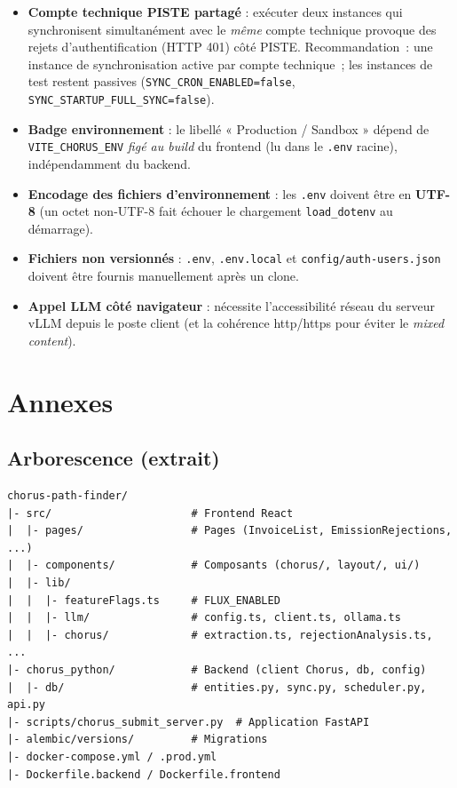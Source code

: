 \documentclass[11pt,a4paper]{article}
\newcommand{\code}[1]{\texttt{\small #1}}
\begin{document}
\begin{itemize}[nosep]
  \item \textbf{Compte technique PISTE partagé} : exécuter deux instances qui
        synchronisent simultanément avec le \emph{même} compte technique
        provoque des rejets d'authentification (HTTP 401) côté PISTE.
        Recommandation~: une instance de synchronisation active par compte
        technique~; les instances de test restent passives
        (\code{SYNC\_CRON\_ENABLED=false}, \code{SYNC\_STARTUP\_FULL\_SYNC=false}).
  \item \textbf{Badge environnement} : le libellé « Production / Sandbox » dépend
        de \code{VITE\_CHORUS\_ENV} \emph{figé au build} du frontend (lu dans le
        \code{.env} racine), indépendamment du backend.
  \item \textbf{Encodage des fichiers d'environnement} : les \code{.env} doivent
        être en \textbf{UTF-8} (un octet non-UTF-8 fait échouer le chargement
        \code{load\_dotenv} au démarrage).
  \item \textbf{Fichiers non versionnés} : \code{.env}, \code{.env.local} et
        \code{config/auth-users.json} doivent être fournis manuellement après un
        clone.
  \item \textbf{Appel LLM côté navigateur} : nécessite l'accessibilité réseau du
        serveur vLLM depuis le poste client (et la cohérence http/https pour
        éviter le \emph{mixed content}).
\end{itemize}

\section{Annexes}

\subsection{Arborescence (extrait)}
\begin{lstlisting}
chorus-path-finder/
|- src/                      # Frontend React
|  |- pages/                 # Pages (InvoiceList, EmissionRejections, ...)
|  |- components/            # Composants (chorus/, layout/, ui/)
|  |- lib/
|  |  |- featureFlags.ts     # FLUX_ENABLED
|  |  |- llm/                # config.ts, client.ts, ollama.ts
|  |  |- chorus/             # extraction.ts, rejectionAnalysis.ts, ...
|- chorus_python/            # Backend (client Chorus, db, config)
|  |- db/                    # entities.py, sync.py, scheduler.py, api.py
|- scripts/chorus_submit_server.py  # Application FastAPI
|- alembic/versions/         # Migrations
|- docker-compose.yml / .prod.yml
|- Dockerfile.backend / Dockerfile.frontend
\end{lstlisting}
\end{document}
